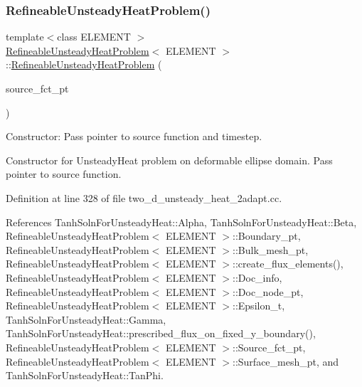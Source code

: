 \subsubsection{\texorpdfstring{Refineable\+Unsteady\+Heat\+Problem()}{RefineableUnsteadyHeatProblem()}}
{\footnotesize\ttfamily template$<$class E\+L\+E\+M\+E\+NT $>$ \\
\hyperlink{classRefineableUnsteadyHeatProblem}{Refineable\+Unsteady\+Heat\+Problem}$<$ E\+L\+E\+M\+E\+NT $>$\+::\hyperlink{classRefineableUnsteadyHeatProblem}{Refineable\+Unsteady\+Heat\+Problem} (\begin{DoxyParamCaption}\item[{Unsteady\+Heat\+Equations$<$ 2 $>$\+::Unsteady\+Heat\+Source\+Fct\+Pt}]{source\+\_\+fct\+\_\+pt }\end{DoxyParamCaption})}



Constructor\+: Pass pointer to source function and timestep. 

Constructor for Unsteady\+Heat problem on deformable ellipse domain. Pass pointer to source function. 

Definition at line 328 of file two\+\_\+d\+\_\+unsteady\+\_\+heat\+\_\+2adapt.\+cc.



References Tanh\+Soln\+For\+Unsteady\+Heat\+::\+Alpha, Tanh\+Soln\+For\+Unsteady\+Heat\+::\+Beta, Refineable\+Unsteady\+Heat\+Problem$<$ E\+L\+E\+M\+E\+N\+T $>$\+::\+Boundary\+\_\+pt, Refineable\+Unsteady\+Heat\+Problem$<$ E\+L\+E\+M\+E\+N\+T $>$\+::\+Bulk\+\_\+mesh\+\_\+pt, Refineable\+Unsteady\+Heat\+Problem$<$ E\+L\+E\+M\+E\+N\+T $>$\+::create\+\_\+flux\+\_\+elements(), Refineable\+Unsteady\+Heat\+Problem$<$ E\+L\+E\+M\+E\+N\+T $>$\+::\+Doc\+\_\+info, Refineable\+Unsteady\+Heat\+Problem$<$ E\+L\+E\+M\+E\+N\+T $>$\+::\+Doc\+\_\+node\+\_\+pt, Refineable\+Unsteady\+Heat\+Problem$<$ E\+L\+E\+M\+E\+N\+T $>$\+::\+Epsilon\+\_\+t, Tanh\+Soln\+For\+Unsteady\+Heat\+::\+Gamma, Tanh\+Soln\+For\+Unsteady\+Heat\+::prescribed\+\_\+flux\+\_\+on\+\_\+fixed\+\_\+y\+\_\+boundary(), Refineable\+Unsteady\+Heat\+Problem$<$ E\+L\+E\+M\+E\+N\+T $>$\+::\+Source\+\_\+fct\+\_\+pt, Refineable\+Unsteady\+Heat\+Problem$<$ E\+L\+E\+M\+E\+N\+T $>$\+::\+Surface\+\_\+mesh\+\_\+pt, and Tanh\+Soln\+For\+Unsteady\+Heat\+::\+Tan\+Phi.

\mbox{\label{classRefineableUnsteadyHeatProblem_a975e00f5e87d77b4e1bf4d50482dea2b}} 
